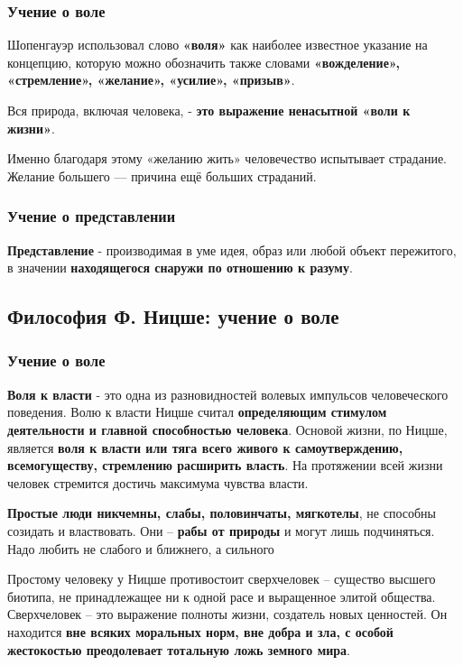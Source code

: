 \documentclass{article}
\begin{document}
\begin{flushleft}
\subsubsection{Учение о воле}

Шопенгауэр использовал слово \textbf{«воля»} как наиболее известное указание на концепцию, которую можно обозначить также словами \textbf{«вожделение», «стремление», «желание», «усилие», «призыв»}.

Вся природа, включая человека, - \textbf{это выражение ненасытной «воли к жизни»}.

Именно благодаря этому «желанию жить» человечество испытывает страдание. Желание большего — причина ещё больших страданий.

\subsubsection{Учение о представлении}

\textbf{Представление} - производимая в уме идея, образ или любой объект пережитого, в значении \textbf{находящегося снаружи по отношению к разуму}.

\subsection{Философия Ф. Ницше: учение о воле}

\subsubsection{Учение о воле}

\textbf{Воля к власти} - это одна из разновидностей волевых импульсов человеческого поведения. Волю к власти Ницше считал \textbf{определяющим стимулом деятельности и главной способностью человека}. Основой жизни, по Ницше, является \textbf{воля к власти или тяга всего живого к самоутверждению, всемогуществу, стремлению расширить власть}. На протяжении всей жизни человек стремится достичь максимума чувства власти.

\textbf{Простые люди никчемны, слабы, половинчаты, мягкотелы}, не способны созидать и властвовать. Они – \textbf{рабы от природы} и могут лишь подчиняться. Надо любить не слабого и ближнего, а сильного

Простому человеку у Ницше противостоит сверхчеловек – существо высшего биотипа, не принадлежащее ни к одной расе и выращенное элитой общества. Сверхчеловек – это выражение полноты жизни, создатель новых ценностей. Он находится \textbf{вне всяких моральных норм, вне добра и зла, с особой жестокостью преодолевает тотальную ложь земного мира}.


\end{flushleft}
\end{document}
